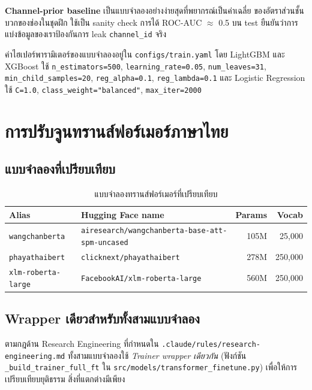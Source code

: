 \textbf{Channel-prior baseline} เป็นแบบจำลองอย่างง่ายสุดที่พยากรณ์เป็นค่าเฉลี่ย
ของอัตราส่วนชั้นบวกของช่องในชุดฝึก ใช้เป็น sanity check การได้ ROC-AUC
$\approx$ 0.5 บน test ยืนยันว่าการแบ่งข้อมูลของเราป้องกันการ leak
\texttt{channel\_id} จริง

ค่าไฮเปอร์พารามิเตอร์ของแบบจำลองอยู่ใน \texttt{configs/train.yaml} โดย
LightGBM และ XGBoost ใช้ \texttt{n\_estimators=500}, \texttt{learning\_rate=0.05},
\texttt{num\_leaves=31}, \texttt{min\_child\_samples=20},
\texttt{reg\_alpha=0.1}, \texttt{reg\_lambda=0.1} และ Logistic Regression
ใช้ \texttt{C=1.0}, \texttt{class\_weight="balanced"}, \texttt{max\_iter=2000}

\section{การปรับจูนทรานส์ฟอร์เมอร์ภาษาไทย}
\label{sec:method-transformers}

\subsection{แบบจำลองที่เปรียบเทียบ}

\begin{table}[H]
\centering
\caption{แบบจำลองทรานส์ฟอร์เมอร์ที่เปรียบเทียบ}
\label{tab:transformers}
\begin{tabularx}{\textwidth}{lXrr}
\toprule
\textbf{Alias} & \textbf{Hugging Face name} & \textbf{Params} & \textbf{Vocab} \\
\midrule
\texttt{wangchanberta} & \texttt{airesearch/wangchanberta-base-att-spm-uncased} & 105M & 25{,}000 \\
\texttt{phayathaibert} & \texttt{clicknext/phayathaibert} & 278M & 250{,}000 \\
\texttt{xlm-roberta-large} & \texttt{FacebookAI/xlm-roberta-large} & 560M & 250{,}000 \\
\bottomrule
\end{tabularx}
\end{table}

\subsection{Wrapper เดียวสำหรับทั้งสามแบบจำลอง}

ตามกฎด้าน Research Engineering ที่กำหนดใน \texttt{.claude/rules/research-engineering.md}
ทั้งสามแบบจำลองใช้ \emph{Trainer wrapper เดียวกัน} (ฟังก์ชัน
\texttt{\_build\_trainer\_full\_ft} ใน \texttt{src/models/transformer\_finetune.py})
เพื่อให้การเปรียบเทียบยุติธรรม สิ่งที่แตกต่างมีเพียง

